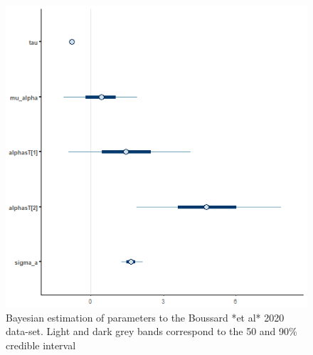 \documentclass[
]{article}
\begin{document}
\begin{figure}

\includegraphics[width=6.67in,]{images/boussard_mcmc_interv} \hfill{}

\caption{Bayesian estimation of parameters to the Boussard *et al* 2020 data-set. Light and dark grey bands correspond to the 50 and 90\% credible interval}\label{fig:boussard_interv}
\end{figure}
\end{document}
